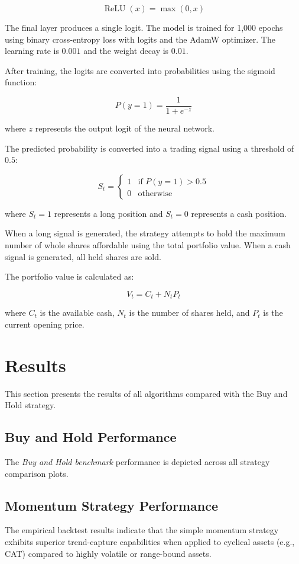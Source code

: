 \documentclass{article}
\begin{document}
\[
\operatorname{ReLU}(x)=\max(0,x)
\]

The final layer produces a single logit. The model is trained for 1,000 epochs
using binary cross-entropy loss with logits and the AdamW optimizer. The
learning rate is \(0.001\) and the weight decay is \(0.01\).

After training, the logits are converted into probabilities using the sigmoid
function:

\[
P(y=1)=\frac{1}{1+e^{-z}}
\]

where \(z\) represents the output logit of the neural network.

The predicted probability is converted into a trading signal using a threshold
of \(0.5\):

\[
S_t =
\begin{cases}
1 & \text{if } P(y=1) > 0.5 \\
0 & \text{otherwise}
\end{cases}
\]

where \(S_t=1\) represents a long position and \(S_t=0\) represents a cash
position.

When a long signal is generated, the strategy attempts to hold the maximum
number of whole shares affordable using the total portfolio value. When a cash
signal is generated, all held shares are sold.

The portfolio value is calculated as:

\[
V_t=C_t+N_tP_t
\]

where \(C_t\) is the available cash, \(N_t\) is the number of shares held, and
\(P_t\) is the current opening price.

\newpage

\section{Results}

This section presents the results of all algorithms compared with the Buy and Hold strategy.

\subsection{Buy and Hold Performance}
The \textit{Buy and Hold benchmark} performance is depicted across all strategy comparison plots.

\subsection{Momentum Strategy Performance}
The empirical backtest results indicate that the simple momentum strategy exhibits superior trend-capture capabilities when applied to cyclical assets (e.g., CAT) compared to highly volatile or range-bound assets.
\end{document}
